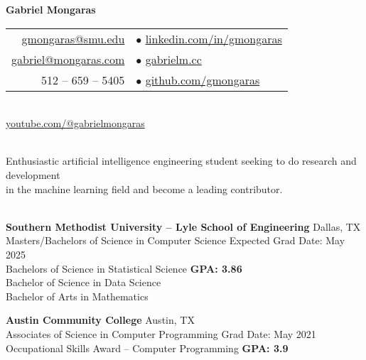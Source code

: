 \documentclass[a4paper,10pt]{article}
\begin{document}
\begin{center}
    {\LARGE \textbf{Gabriel Mongaras}} \\
    \vspace{10pt}
    \begin{tabular}{r l}
        \href{mailto:gmongaras@smu.edu}{gmongaras@smu.edu} \quad & $\bullet$ \quad \href{https://www.linkedin.com/in/gmongaras}{linkedin.com/in/gmongaras} \\
        \href{mailto:gabriel@mongaras.com}{gabriel@mongaras.com} \quad & $\bullet$ \quad \href{https://gabrielm.cc/}{gabrielm.cc} \\
        512 – 659 – 5405 \quad & $\bullet$ \quad \href{https://github.com/gmongaras}{github.com/gmongaras} \\
    \end{tabular} \\
    \href{https://www.youtube.com/@gabrielmongaras}{youtube.com/@gabrielmongaras} \\
\end{center}

\noindent\hrulefill

 \vspace{1pt} \\
Enthusiastic artificial intelligence engineering student seeking to do research and development \\
in the machine learning field and become a leading contributor.

\vspace{5pt}
 \vspace{1pt} \\
\textbf{Southern Methodist University – Lyle School of Engineering} \hfill Dallas, TX \\
Masters/Bachelors of Science in Computer Science \hfill Expected Grad Date: May 2025 \\
Bachelors of Science in Statistical Science \hfill \textbf{GPA: 3.86} \\
Bachelor of Science in Data Science \\
Bachelor of Arts in Mathematics

\vspace{5pt}
\noindent\textbf{Austin Community College} \hfill Austin, TX \\
Associates of Science in Computer Programming \hfill Grad Date: May 2021 \\
Occupational Skills Award – Computer Programming \hfill \textbf{GPA: 3.9}
\end{document}
